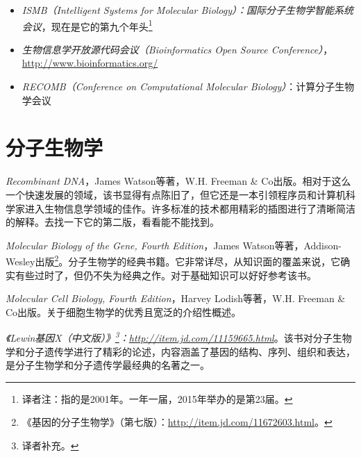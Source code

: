 \begin{itemize}
  \item \textit{ISMB（Intelligent Systems for Molecular Biology）：国际分子生物学智能系统会议}，现在是它的第九个年头\footnote{译者注：指的是2001年。一年一届，2015年举办的是第23届。}
  \item \textit{生物信息学开放源代码会议（Bioinformatics Open Source Conference）}，\href{http://www.bioinformatics.org/}{http://www.bioinformatics.org/}
  \item \textit{RECOMB（Conference on Computational Molecular Biology）}：计算分子生物学会议
\end{itemize}

\section{分子生物学}
\textit{Recombinant DNA}，James Watson等著，W.H. Freeman \& Co出版。相对于这么一个快速发展的领域，该书显得有点陈旧了，但它还是一本引领程序员和计算机科学家进入生物信息学领域的佳作。许多标准的技术都用精彩的插图进行了清晰简洁的解释。去找一下它的第二版，看看能不能找到。

\textit{Molecular Biology of the Gene, Fourth Edition}，James Watson等著，Addison-Wesley出版\footnote{《基因的分子生物学》（第七版）：\href{http://item.jd.com/11672603.html}{http://item.jd.com/11672603.html}。}。分子生物学的经典书籍。它非常详尽，从知识面的覆盖来说，它确实有些过时了，但仍不失为经典之作。对于基础知识可以好好参考该书。

\textit{Molecular Cell Biology, Fourth Edition}，Harvey Lodish等著，W.H.  Freeman \& Co出版。关于细胞生物学的优秀且宽泛的介绍性概述。

\textit{《Lewin基因X（中文版）》\footnote{译者补充。}：\href{http://item.jd.com/11159665.html}{http://item.jd.com/11159665.html}}。该书对分子生物学和分子遗传学进行了精彩的论述，内容涵盖了基因的结构、序列、组织和表达，是分子生物学和分子遗传学最经典的名著之一。
